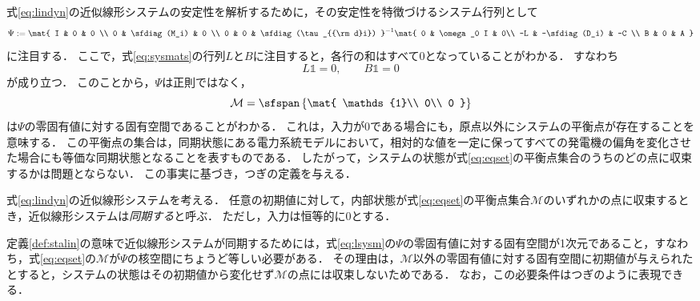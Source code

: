 \documentclass[a4j,10pt,oneside,openany,dvipdfmx]{jsbook}
\begin{document}
式\eqref{eq:lindyn}の近似線形システムの安定性を解析するために，その安定性を特徴づけるシステム行列として
\begin{equation}\label{eq:lsysm}
\Psi :=
\mat{
I & 0 & 0 \\
0 & \sfdiag(M_i) & 0 \\
0 & 0 & \sfdiag(\tau_{{\rm d}i}) 
}^{-1}
\mat{
0 & \omega_0 I & 0\\
 -L & -\sfdiag(D_i) & -C \\
 B & 0 & A
 }
\end{equation}
に注目する．
ここで，式\eqref{eq:sysmats}の行列$L$と$B$に注目すると，各行の和はすべて0となっていることがわかる．
すなわち
\begin{equation}\label{eq:LBker}
L  \mathds{1} = 0
,\qquad
 B  \mathds{1} =0
\end{equation}
が成り立つ．
このことから，$\Psi$は正則ではなく，
\begin{equation}\label{eq:eqset}
\mathcal{M} =
 \sfspan\left\{
 \mat{
 \mathds{1}\\
 0\\
 0
 }
 \right\}
\end{equation}
は$\Psi$の零固有値に対する固有空間であることがわかる．
これは，入力が0である場合にも，原点以外にシステムの平衡点が存在することを意味する．
この平衡点の集合は，同期状態にある電力系統モデルにおいて，相対的な値を一定に保ってすべての発電機の偏角を変化させた場合にも等価な同期状態となることを表すものである．
したがって，システムの状態が式\eqref{eq:eqset}の平衡点集合のうちのどの点に収束するかは問題とならない．
この事実に基づき，つぎの定義を与える．

\begin{definition}\label{def:stalin}
式\eqref{eq:lindyn}の近似線形システムを考える．
任意の初期値に対して，内部状態が式\eqref{eq:eqset}の平衡点集合$\mathcal{M}$のいずれかの点に収束するとき，近似線形システムは\emph{同期する}と呼ぶ．
ただし，入力は恒等的に0とする．
\end{definition}

定義\ref{def:stalin}の意味で近似線形システムが同期するためには，式\eqref{eq:lsysm}の$\Psi$の零固有値に対する固有空間が1次元であること，すなわち，式\eqref{eq:eqset}の$\mathcal{M}$が$\Psi$の核空間にちょうど等しい必要がある．
その理由は，$\mathcal{M}$以外の零固有値に対する固有空間に初期値が与えられたとすると，システムの状態はその初期値から変化せず$\mathcal{M}$の点には収束しないためである．
なお，この必要条件はつぎのように表現できる．
\end{document}
